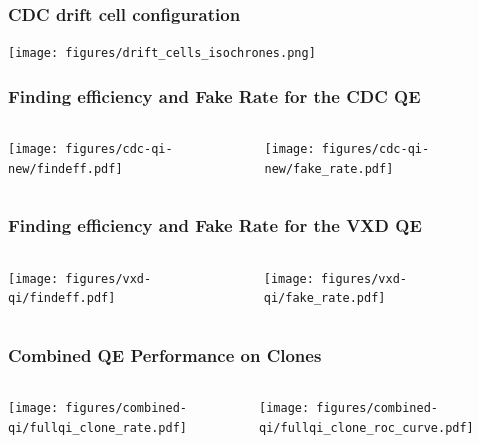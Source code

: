 \documentclass[18pt, aspectratio=169]{beamer}
\begin{document}
\begin{frame}
  \frametitle{CDC drift cell configuration}
  \center
  \texttt{[image: figures/drift\_cells\_isochrones.png]}
\end{frame}

\begin{frame} 
  \frametitle{Finding efficiency and Fake Rate for the CDC QE}
  \begin{columns}
    \begin{column}{.5\textwidth}
      \texttt{[image: figures/cdc-qi-new/findeff.pdf]}
    \end{column}
    \begin{column}{.5\textwidth}
      \texttt{[image: figures/cdc-qi-new/fake\_rate.pdf]}
    \end{column}
  \end{columns}
\end{frame}

\begin{frame} 
  \frametitle{Finding efficiency and Fake Rate for the VXD QE}
  \begin{columns}
    \begin{column}{.5\textwidth}
      \texttt{[image: figures/vxd-qi/findeff.pdf]}
    \end{column}
    \begin{column}{.5\textwidth}
      \texttt{[image: figures/vxd-qi/fake\_rate.pdf]}
    \end{column}
  \end{columns}
\end{frame}

\begin{frame}
  \frametitle{Combined QE Performance on Clones}
  \begin{columns}
    \begin{column}{.5\textwidth}
      \center
      \texttt{[image: figures/combined-qi/fullqi\_clone\_rate.pdf]}
    \end{column}
    \begin{column}{.5\textwidth}
      \center
      \texttt{[image: figures/combined-qi/fullqi\_clone\_roc\_curve.pdf]}
    \end{column}
  \end{columns}
\end{frame}
\end{document}
